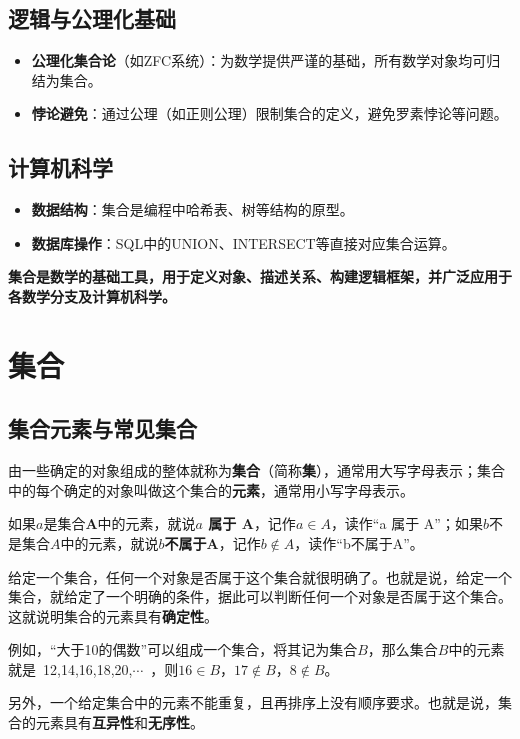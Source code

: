 \documentclass[a5paper]{article}
\begin{document}
\subsection*{逻辑与公理化基础}
\begin{itemize}
    \item \textbf{公理化集合论}（如ZFC系统）：为数学提供严谨的基础，所有数学对象均可归结为集合。
    \item \textbf{悖论避免}：通过公理（如正则公理）限制集合的定义，避免罗素悖论等问题。
\end{itemize}

\subsection*{计算机科学}
\begin{itemize}
    \item \textbf{数据结构}：集合是编程中哈希表、树等结构的原型。
    \item \textbf{数据库操作}：SQL中的UNION、INTERSECT等直接对应集合运算。
\end{itemize}

\textbf{集合是数学的基础工具，用于定义对象、描述关系、构建逻辑框架，并广泛应用于各数学分支及计算机科学。}

\section{\textbf{集合}}

\subsection{集合元素与常见集合}

由一些确定的对象组成的整体就称为\textbf{集合}（简称\textbf{集}），通常用大写字母表示；集合中的每个确定的对象叫做这个集合的\textbf{元素}，通常用小写字母表示。

如果$a$是集合\textbf{A}中的元素，就说\textbf{$a$ 属于 A}，记作$a \in A$，读作“a 属于 A”；如果$b$不是集合$A$中的元素，就说\textbf{$b$不属于A}，记作$b\notin A$，读作“b不属于A”。

\begin{tcolorbox}[colframe = blue!20, title = {\color{red} 提示}]
    给定一个集合，任何一个对象是否属于这个集合就很明确了。也就是说，给定一个集合，就给定了一个明确的条件，据此可以判断任何一个对象是否属于这个集合。这就说明集合的元素具有\textbf{确定性}。

    例如，“大于10的偶数”可以组成一个集合，将其记为集合$B$，那么集合$B$中的元素就是~12,14,16,18,20,$\cdots$~，则$16 \in B$，$17 \notin B$，$8 \notin B$。

    另外，一个给定集合中的元素不能重复，且再排序上没有顺序要求。也就是说，集合的元素具有\textbf{互异性}和\textbf{无序性}。
\end{tcolorbox}
\end{document}

